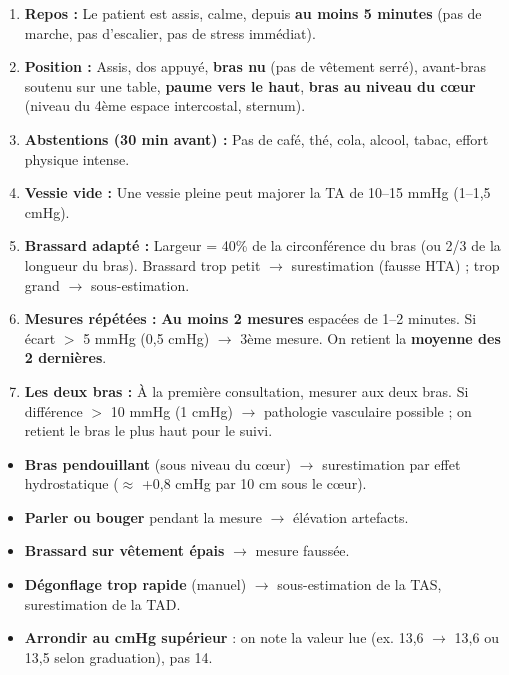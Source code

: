 \documentclass[11pt]{article}
\begin{document}
\begin{methode}
\begin{enumerate}
    \item \textbf{Repos :} Le patient est assis, calme, depuis \textbf{au moins 5 minutes} (pas de marche, pas d'escalier, pas de stress immédiat).
    \item \textbf{Position :} Assis, dos appuyé, \textbf{bras nu} (pas de vêtement serré), avant-bras soutenu sur une table, \textbf{paume vers le haut}, \textbf{bras au niveau du cœur} (niveau du 4ème espace intercostal, sternum).
    \item \textbf{Abstentions (30 min avant) :} Pas de café, thé, cola, alcool, tabac, effort physique intense.
    \item \textbf{Vessie vide :} Une vessie pleine peut majorer la TA de 10--15 mmHg (1--1,5 cmHg).
    \item \textbf{Brassard adapté :} Largeur = 40\% de la circonférence du bras (ou 2/3 de la longueur du bras). Brassard trop petit $\rightarrow$ surestimation (fausse HTA) ; trop grand $\rightarrow$ sous-estimation.
    \item \textbf{Mesures répétées :} \textbf{Au moins 2 mesures} espacées de 1--2 minutes. Si écart $>$ 5 mmHg (0,5 cmHg) $\rightarrow$ 3ème mesure. On retient la \textbf{moyenne des 2 dernières}.
    \item \textbf{Les deux bras :} À la première consultation, mesurer aux deux bras. Si différence $>$ 10 mmHg (1 cmHg) $\rightarrow$ pathologie vasculaire possible ; on retient le bras le plus haut pour le suivi.
\end{enumerate}
\end{methode}

\begin{attention}
\begin{itemize}
    \item \textbf{Bras pendouillant} (sous niveau du cœur) $\rightarrow$ surestimation par effet hydrostatique ($\approx$ +0,8 cmHg par 10 cm sous le cœur).
    \item \textbf{Parler ou bouger} pendant la mesure $\rightarrow$ élévation artefacts.
    \item \textbf{Brassard sur vêtement épais} $\rightarrow$ mesure faussée.
    \item \textbf{Dégonflage trop rapide} (manuel) $\rightarrow$ sous-estimation de la TAS, surestimation de la TAD.
    \item \textbf{Arrondir au cmHg supérieur} : on note la valeur lue (ex. 13,6 $\rightarrow$ 13,6 ou 13,5 selon graduation), pas 14.
\end{itemize}
\end{attention}
\end{document}
